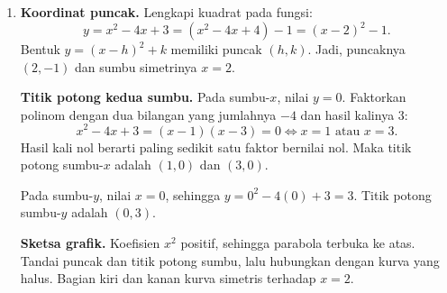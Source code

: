 \documentclass[11pt,a4paper]{article}
\begin{document}
\begin{enumerate}
        Pindahkan konstanta ke ruas kanan, lalu kelompokkan suku $x$ dan suku $y$:
        \[
          (x^2-8x)+(y^2+2y)=8.
        \]
        Untuk $x^2-8x$, tambahkan $(-8/2)^2=16$ agar menjadi $(x-4)^2$.
        Untuk $y^2+2y$, tambahkan $(2/2)^2=1$ agar menjadi $(y+1)^2$.
        Kedua ruas harus ditambah dengan nilai yang sama:
        \begin{align*}
          (x^2-8x+16)+(y^2+2y+1) & =8+16+1, \\
          (x-4)^2+(y+1)^2        & =25.
        \end{align*}
        Jadi, bentuk bakunya $\boxed{(x-4)^2+(y+1)^2=25}$.
        Karena $y+1=y-(-1)$, pusatnya adalah $\boxed{(4,-1)}$.
        Jari-jarinya $\boxed{r=\sqrt{25}=5}$.

  \item \textbf{Koordinat puncak.}
        Lengkapi kuadrat pada fungsi:
        \[
          y=x^2-4x+3=(x^2-4x+4)-1=(x-2)^2-1.
        \]
        Bentuk $y=(x-h)^2+k$ memiliki puncak $(h,k)$.
        Jadi, puncaknya $\boxed{(2,-1)}$ dan sumbu simetrinya $x=2$.

        \textbf{Titik potong kedua sumbu.}
        Pada sumbu-$x$, nilai $y=0$.
        Faktorkan polinom dengan dua bilangan yang jumlahnya $-4$ dan hasil kalinya $3$:
        \[
          x^2-4x+3=(x-1)(x-3)=0\iff x=1\text{ atau }x=3.
        \]
        Hasil kali nol berarti paling sedikit satu faktor bernilai nol.
        Maka titik potong sumbu-$x$ adalah $\boxed{(1,0)}$ dan $\boxed{(3,0)}$.

        Pada sumbu-$y$, nilai $x=0$, sehingga $y=0^2-4(0)+3=3$.
        Titik potong sumbu-$y$ adalah $\boxed{(0,3)}$.

        \textbf{Sketsa grafik.}
        Koefisien $x^2$ positif, sehingga parabola terbuka ke atas.
        Tandai puncak dan titik potong sumbu, lalu hubungkan dengan kurva yang halus.
        Bagian kiri dan kanan kurva simetris terhadap $x=2$.


\end{enumerate}
\end{document}
